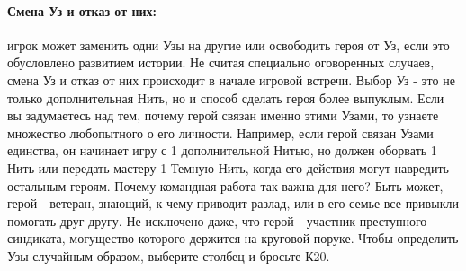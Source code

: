 \paragraph{Смена Уз и отказ от них:} игрок может заменить одни Узы на другие или освободить героя от Уз, если это обусловлено развитием истории. Не считая специально оговоренных случаев, смена Уз и отказ от них происходит в начале игровой встречи.
\newline Выбор Уз - это не только дополнительная Нить, но и способ сделать героя более выпуклым. Если вы задумаетесь над тем, почему герой связан именно этими Узами, то узнаете множество любопытного о его личности. Например, если герой связан Узами единства, он начинает игру с 1 дополнительной Нитью, но должен оборвать 1 Нить или передать мастеру 1 Темную Нить, когда его действия могут навредить остальным героям. Почему командная работа так важна для него? Быть может, герой - ветеран, знающий, к чему приводит разлад, или в его семье все привыкли помогать друг другу. Не исключено даже, что герой - участник преступного синдиката, могущество которого держится на круговой поруке.
\newline Чтобы определить Узы случайным образом, выберите столбец и бросьте К20.
